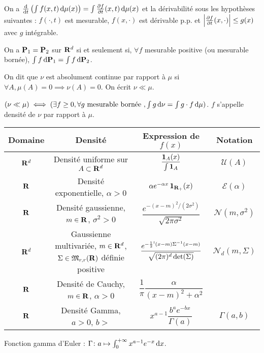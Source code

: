 \begin{thm}
	On a $\frac{\mathop{}\mathopen{}\mathrm{d}}{\mathop{}\mathopen{}\mathrm{d} t}\left( \int f(x,t) \mathop{}\mathopen{}\mathrm{d} \mu(x) \right) = \int \frac{\partial f}{\partial t}(x,t) \mathop{}\mathopen{}\mathrm{d} \mu(x)$ et la dérivabilité sous les hypothèses suivantes : $f(\cdot,t)$ est mesurable, $f(x,\cdot)$ est dérivable p.p. et $\left\lvert\frac{\partial f}{\partial t}(x,\cdot)\right\rvert \leq g(x)$ avec $g$ intégrable.
\end{thm}

\begin{thm}
	On a $\mathbf{P}_1 = \mathbf{P}_2$ sur $\mathbf{R}^d$ si et seulement si, $\forall f$ mesurable positive (ou mesurable bornée), $\int f \mathop{}\mathopen{}\mathrm{d} \mathbf{P}_1 = \int f \mathop{}\mathopen{}\mathrm{d} \mathbf{P}_2$.
\end{thm}

\begin{thm}
	On dit que $\nu$ est absolument continue par rapport à $\mu$ si $\forall A, \mu(A) = 0 \implies \nu(A) = 0$.
	On écrit $\nu \ll \mu$.
\end{thm}

\begin{thm}
	$(\nu \ll \mu) \iff (\exists f \geq 0, \forall g \text{ mesurable bornée }, \int g \mathop{}\mathopen{}\mathrm{d} \nu = \int g \cdot f \mathop{}\mathopen{}\mathrm{d} \mu)$.
	$f$ s'appelle densité de $\nu$ par rapport à $\mu$.
\end{thm}

\begin{tabular}{c|c|c|c}
	Domaine & Densité & Expression de $f(x)$ & Notation \\
	\hline
	$\mathbf{R}^d$ & Densité uniforme sur $A \subset \mathbf{R}^d$ & $\dfrac{\operatorname{\mathbf{1}}_A (x)}{\int \operatorname{\mathbf{1}}_A}$ & $\mathcal{U}(A)$ \\
	\hline
	$\mathbf{R}$ & Densité exponentielle, $\alpha > 0$ & $\alpha e^{-\alpha x} \operatorname{\mathbf{1}}_{\mathbf{R}_+}(x)$ & $\mathcal{E}(\alpha)$ \\
	\hline
	$\mathbf{R}$ & Densité gaussienne, $m \in \mathbf{R}$, $\sigma^2 > 0$ & $\dfrac{e^{-(x - m)^2 / (2 \sigma^2)}}{\sqrt{2 \pi \sigma^2}}$ & $\mathcal{N}(m,\sigma^2)$ \\
	\hline
	$\mathbf{R}^d$ & Gaussienne multivariée, $m \in \mathbf{R}^d$, $\Sigma \in \mathfrak{M}_{r,r}(\mathbf{R})$ définie positive & $\dfrac{e^{-\frac{1}{2} \transp{(x - m)} \Sigma^{-1} (x - m)}}{\sqrt{(2 \pi)^d \det(\Sigma)}}$ & $\mathcal{N}_d(m,\Sigma)$ \\
	\hline
	$\mathbf{R}$ & Densité de Cauchy, $m \in \mathbf{R}$, $\alpha > 0$ & $\dfrac{1}{\pi} \dfrac{\alpha}{(x - m)^2 + \alpha^2}$ & \\
	\hline
	$\mathbf{R}$ & Densité Gamma, $a > 0$, $b > $ & $x^{a - 1} \dfrac{b^a e^{-bx}}{\Gamma(a)}$ & $\Gamma(a,b)$ \\
\end{tabular}

Fonction gamma d'Euler : $\Gamma \colon a \mapsto \int_0^{+\infty} x^{a - 1} e^{-x} \mathop{}\mathopen{}\mathrm{d} x$. 
